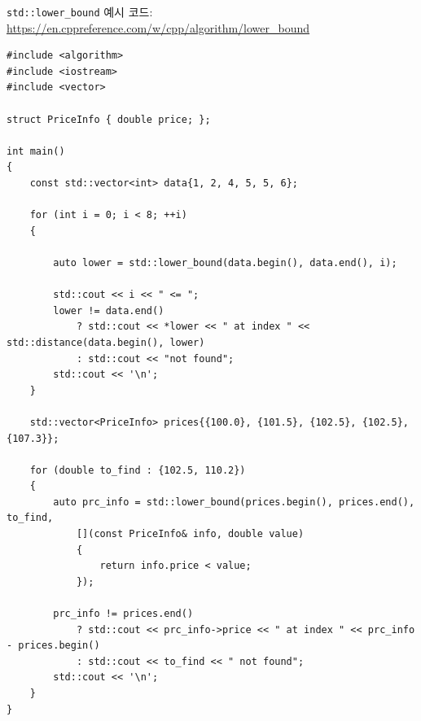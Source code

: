 \begin{code} \label{code: lower_bound}
\texttt{std::lower\_bound} 예시 코드: \url{https://en.cppreference.com/w/cpp/algorithm/lower_bound}
\begin{lstlisting}
#include <algorithm>
#include <iostream>
#include <vector>
    
struct PriceInfo { double price; };
    
int main()
{
    const std::vector<int> data{1, 2, 4, 5, 5, 6};
    
    for (int i = 0; i < 8; ++i)
    {
        
        auto lower = std::lower_bound(data.begin(), data.end(), i);
    
        std::cout << i << " <= ";
        lower != data.end()
            ? std::cout << *lower << " at index " << std::distance(data.begin(), lower)
            : std::cout << "not found";
        std::cout << '\n';
    }
    
    std::vector<PriceInfo> prices{{100.0}, {101.5}, {102.5}, {102.5}, {107.3}};
    
    for (double to_find : {102.5, 110.2})
    {
        auto prc_info = std::lower_bound(prices.begin(), prices.end(), to_find,
            [](const PriceInfo& info, double value)
            {
                return info.price < value;
            });
    
        prc_info != prices.end()
            ? std::cout << prc_info->price << " at index " << prc_info - prices.begin()
            : std::cout << to_find << " not found";
        std::cout << '\n';
    }
}
\end{lstlisting}
\end{code}

